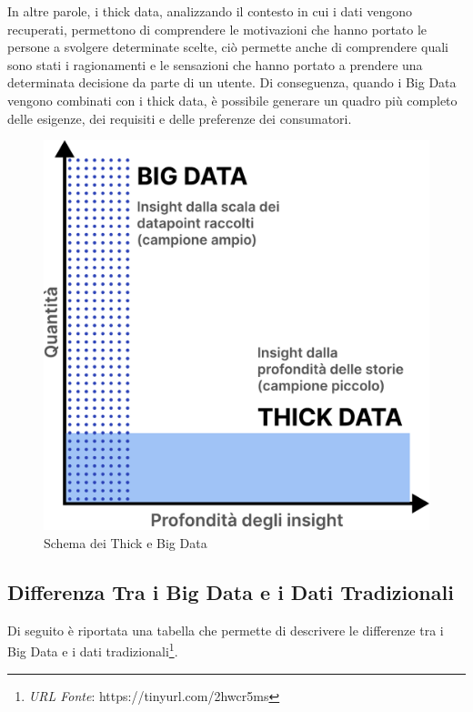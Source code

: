 In altre parole, i thick data, analizzando il contesto in cui i dati vengono recuperati, permettono di comprendere le motivazioni che hanno portato le persone a svolgere determinate scelte, ciò permette anche di comprendere quali sono stati i ragionamenti e le sensazioni che hanno portato a prendere una determinata decisione da parte di un utente. Di conseguenza, quando i Big Data vengono combinati con i thick data, è possibile generare un quadro più completo delle esigenze, dei requisiti e delle preferenze dei consumatori.

\begin{figure}[H]
    \centering
    \includegraphics[width=0.4\linewidth]{figure/capitolo_2/Thick and Big Data.pdf}
    \caption{Schema dei Thick e Big Data}
    \label{fig:Thick and Big Data}
\end{figure}

\subsection{Differenza Tra i Big Data e i Dati Tradizionali}

Di seguito è riportata una tabella che permette di descrivere le differenze tra i Big Data e i dati tradizionali\footnote{\textit{URL Fonte}: https://tinyurl.com/2hwcr5ms}.

